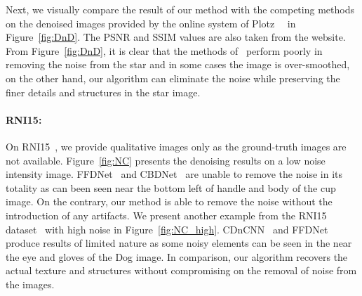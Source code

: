 \documentclass[10pt,twocolumn,letterpaper]{article}
\begin{document}
Next, we visually compare the result of our method with the competing methods on the denoised images provided by the online system of Plotz~\etal~\cite{plotz2017benchmarking} in Figure~\ref{fig:DnD}. The PSNR and SSIM values are also taken from the website. From Figure~\ref{fig:DnD}, it is clear that the methods of~\cite{guo2018CBDnet,zhang2018ffdnet,zhang2017DnCNN} perform poorly in removing the noise from the star and in some cases the image is over-smoothed, on the other hand, our algorithm can eliminate the noise while preserving the finer details and structures in the star image.

\paragraph{RNI15:} On RNI15~\cite{lebrun2015NC}, we provide qualitative images only as the ground-truth images are not available. Figure~\ref{fig:NC} presents the denoising results on a low noise intensity image. FFDNet~\cite{zhang2018ffdnet} and CBDNet~\cite{guo2018CBDnet} are unable to remove the noise in its totality as can been seen near the bottom left of handle and body of the cup image. On the contrary, our method is able to remove the noise without the introduction of any artifacts. We present another example from the RNI15 dataset~\cite{lebrun2015NC} with high noise in Figure~\ref{fig:NC_high}. CDnCNN~\cite{zhang2017DnCNN} and FFDNet~\cite{zhang2018ffdnet} produce results of limited nature as some noisy elements can be seen in the near the eye and gloves of the Dog image. In comparison, our algorithm recovers the actual texture and structures without compromising on the removal of noise from the images.
\end{document}
